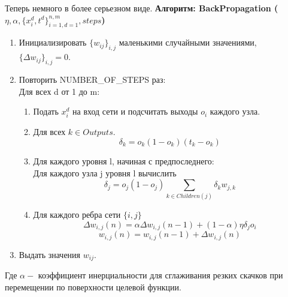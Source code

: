 \documentclass[paper=a4, fontsize=11pt]{scrartcl} %
\numberwithin{equation}{section} %
\numberwithin{figure}{section} %
\numberwithin{table}{section} %
\begin{document}
	Теперь немного в более серьезном виде.
	\textbf{Алгоритм: BackPropagation ($\eta, \alpha, \{x^d_i, t^d\}^{n,m}_{i=1,d=1}, steps$)}

	\begin{enumerate}
		\item Инициализировать $\{w_{ij}\}_{i,j}$  маленькими случайными значениями, $\{\Delta w_{ij}\}_{i,j} = 0$.
		\item Повторить NUMBER\_OF\_STEPS раз:\\
		Для всех d от 1 до m:
		\begin{enumerate}
			\item Подать ${x_i^d}$ на вход сети и подсчитать выходы $o_i$ каждого узла.
			\item Для всех $k \in Outputs$.
			$$\delta_k = o_k(1-o_k)(t_k-o_k)$$
			\item Для каждого уровня l, начиная с предпоследнего:\\
			Для каждого узла j уровня l вычислить
			$$\delta_j = o_j(1-o_j) \sum_{k \in Children(j)} \delta_k w_{j,k}$$
			\item Для каждого ребра сети $\{i, j\}$
			$$\Delta w_{i,j}(n) = \alpha \Delta w_{i,j} (n-1) + (1-\alpha) \eta \delta_j o_i$$
			$$w_{i,j}(n) =w_{i,j} (n-1) + \Delta w_{i,j}(n)$$
		\end{enumerate}
	\item Выдать значения $w_{ij}$.
	\end{enumerate}
	Где $\alpha - $ коэффициент инерциальности для сглаживания резких скачков при перемещении по поверхности целевой функции.
\end{document}

